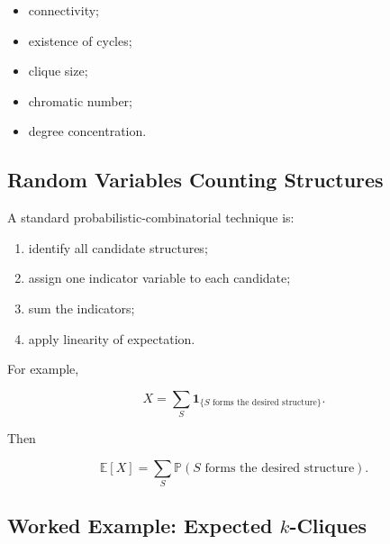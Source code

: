 \begin{itemize}
    \item connectivity;
    \item existence of cycles;
    \item clique size;
    \item chromatic number;
    \item degree concentration.
\end{itemize}

\subsection{Random Variables Counting Structures}
\label{subsec:random-counting-variables}

A standard probabilistic-combinatorial technique is:

\begin{enumerate}
    \item identify all candidate structures;
    \item assign one indicator variable to each candidate;
    \item sum the indicators;
    \item apply linearity of expectation.
\end{enumerate}

For example,

\[
X
=
\sum_{S}
\mathbf{1}_{\{S\text{ forms the desired structure}\}}.
\]

Then

\[
\mathbb{E}[X]
=
\sum_S
\mathbb{P}(S\text{ forms the desired structure}).
\]

\subsection{Worked Example: Expected \(k\)-Cliques}
\label{subsec:worked-expected-k-cliques}

